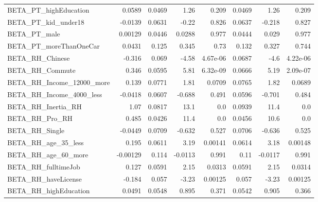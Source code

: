 \begin{tabular}{lrrrrrrr}
BETA\_PT\_highEducation        &   0.0589 &   0.0469 &     1.26 &    0.209 &        0.0469 &         1.26 &         0.209 \\
BETA\_PT\_kid\_under18          &  -0.0139 &   0.0631 &    -0.22 &    0.826 &        0.0637 &       -0.218 &         0.827 \\
BETA\_PT\_male                 &  0.00129 &   0.0446 &   0.0288 &    0.977 &        0.0444 &        0.029 &         0.977 \\
BETA\_PT\_moreThanOneCar       &   0.0431 &    0.125 &    0.345 &     0.73 &         0.132 &        0.327 &         0.744 \\
BETA\_RH\_Chinese              &   -0.316 &    0.069 &    -4.58 & 4.67e-06 &        0.0687 &         -4.6 &      4.22e-06 \\
BETA\_RH\_Commute              &    0.346 &   0.0595 &     5.81 & 6.32e-09 &        0.0666 &         5.19 &      2.09e-07 \\
BETA\_RH\_Income\_12000\_more    &    0.139 &   0.0771 &     1.81 &   0.0709 &        0.0765 &         1.82 &        0.0689 \\
BETA\_RH\_Income\_4000\_less     &  -0.0418 &   0.0607 &   -0.688 &    0.491 &        0.0596 &       -0.701 &         0.484 \\
BETA\_RH\_Inertia\_RH           &     1.07 &   0.0817 &     13.1 &      0.0 &        0.0939 &         11.4 &           0.0 \\
BETA\_RH\_Pro\_RH               &    0.485 &   0.0426 &     11.4 &      0.0 &        0.0456 &         10.6 &           0.0 \\
BETA\_RH\_Single               &  -0.0449 &   0.0709 &   -0.632 &    0.527 &        0.0706 &       -0.636 &         0.525 \\
BETA\_RH\_age\_35\_less          &    0.195 &   0.0611 &     3.19 &  0.00141 &        0.0614 &         3.18 &       0.00148 \\
BETA\_RH\_age\_60\_more          & -0.00129 &    0.114 &  -0.0113 &    0.991 &          0.11 &      -0.0117 &         0.991 \\
BETA\_RH\_fulltimeJob          &    0.127 &   0.0591 &     2.15 &   0.0313 &        0.0591 &         2.15 &        0.0314 \\
BETA\_RH\_haveLicense          &   -0.184 &    0.057 &    -3.23 &  0.00125 &         0.057 &        -3.23 &       0.00125 \\
BETA\_RH\_highEducation        &   0.0491 &   0.0548 &    0.895 &    0.371 &        0.0542 &        0.905 &         0.366 \\

\end{tabular}
